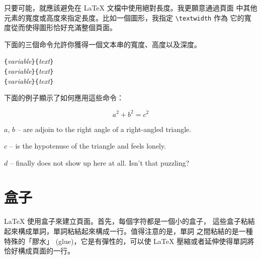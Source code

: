 只要可能，就應該避免在 \LaTeX{} 文檔中使用絕對長度。我更願意通過頁面
中其他元素的寬度或高度來指定長度。比如一個圖形，我指定 \verb|\textwidth| 作為
它的寬度從而使得圖形恰好充滿整個頁面。

下面的三個命令允許你獲得一個文本串的寬度、高度以及深度。

\begin{lscommand}
\verb|{|\emph{variable}\verb|}{|\emph{text}\verb|}|\\
\verb|{|\emph{variable}\verb|}{|\emph{text}\verb|}|\\
\verb|{|\emph{variable}\verb|}{|\emph{text}\verb|}|
\end{lscommand}

\noindent 下面的例子顯示了如何應用這些命令：
\begin{example}
\flushleft
\newenvironment{vardesc}[1]{%
  \settowidth{\parindent}{#1:\ }
  \makebox[0pt][r]{#1:\ }}{}

\begin{displaymath}
a^2+b^2=c^2
\end{displaymath}

\begin{vardesc}{Where}$a$,
$b$ -- are adjoin to the right
angle of a right-angled triangle.

$c$ -- is the hypotenuse of
the triangle and feels lonely.

$d$ -- finally does not show up
here at all. Isn't that puzzling?
\end{vardesc}
\end{example}


\section{盒子}
\LaTeX{} 使用盒子來建立頁面。首先，每個字符都是一個小的盒子，
這些盒子粘結起來構成單詞，單詞粘結起來構成一行。值得注意的是，單詞
之間粘結的是一種特殊的「膠水」 (glue)，它是有彈性的，可以使 \LaTeX{} 壓縮或者延伸使得單詞將恰好構成頁面的一行。

